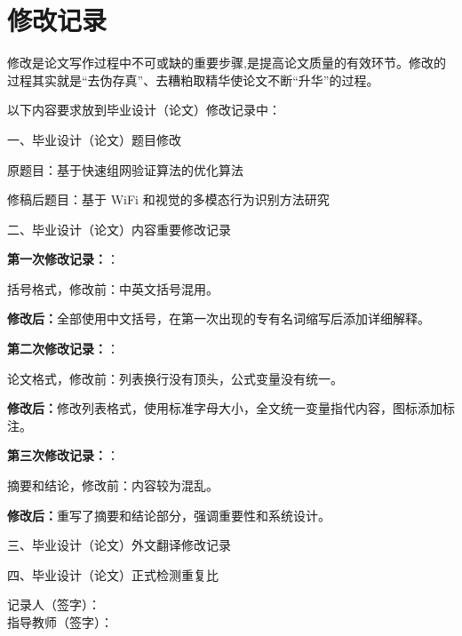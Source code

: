
\chapter*{\hfill 修改记录 \hfill}
\linespread{1.25}
\sloppy{}

修改是论文写作过程中不可或缺的重要步骤,是提高论文质量的有效环节。修改的过程其实就是“去伪存真”、去糟粕取精华使论文不断“升华”的过程。

以下内容要求放到毕业设计（论文）修改记录中：

一、毕业设计（论文）题目修改

原题目：基于快速组网验证算法的优化算法

修稿后题目：基于 WiFi 和视觉的多模态行为识别方法研究

二、毕业设计（论文）内容重要修改记录

{\textbf {第一次修改记录：}}：

括号格式，修改前：中英文括号混用。

{\textbf{修改后：}}全部使用中文括号，在第一次出现的专有名词缩写后添加详细解释。

{\textbf {第二次修改记录：}}：

论文格式，修改前：列表换行没有顶头，公式变量没有统一。

{\textbf{修改后：}}修改列表格式，使用标准字母大小，全文统一变量指代内容，图标添加标注。

{\textbf {第三次修改记录：}}：

摘要和结论，修改前：内容较为混乱。

{\textbf{修改后：}}重写了摘要和结论部分，强调重要性和系统设计。

三、毕业设计（论文）外文翻译修改记录

四、毕业设计（论文）正式检测重复比

\hspace*{7.8cm}记录人（签字）：\\
\hspace*{8.2cm}指导教师（签字）：